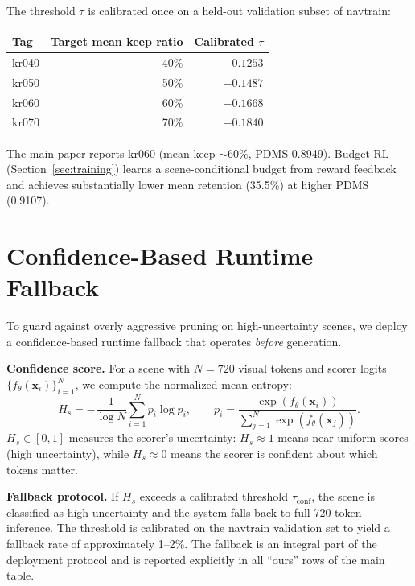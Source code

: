 \documentclass[letterpaper]{article}
\begin{document}
The threshold $\tau$ is calibrated once on a held-out validation subset of navtrain:
\begin{center}
\begin{tabular}{@{}lrr@{}}
\toprule
Tag & Target mean keep ratio & Calibrated $\tau$ \\
\midrule
kr040 & 40\% & $-0.1253$ \\
kr050 & 50\% & $-0.1487$ \\
kr060 & 60\% & $-0.1668$ \\
kr070 & 70\% & $-0.1840$ \\
\bottomrule
\end{tabular}
\end{center}

The main paper reports kr060 (mean keep $\sim$60\%, PDMS 0.8949). Budget RL (Section~\ref{sec:training})
learns a scene-conditional budget from reward feedback and achieves substantially lower mean
retention (35.5\%) at higher PDMS (0.9107).

\section{Confidence-Based Runtime Fallback}
\label{sec:fallback}

To guard against overly aggressive pruning on high-uncertainty scenes, we deploy a confidence-based
runtime fallback that operates \emph{before} generation.

\textbf{Confidence score.} For a scene with $N{=}720$ visual tokens and scorer logits
$\{f_\theta(\mathbf{x}_i)\}_{i=1}^{N}$, we compute the normalized mean entropy:
\begin{equation}
H_s = -\frac{1}{\log N}\sum_{i=1}^{N} p_i\log p_i,\qquad
p_i = \frac{\exp(f_\theta(\mathbf{x}_i))}{\sum_{j=1}^{N}\exp(f_\theta(\mathbf{x}_j))}.
\end{equation}
$H_s \in [0,1]$ measures the scorer's uncertainty: $H_s \approx 1$ means near-uniform scores (high
uncertainty), while $H_s \approx 0$ means the scorer is confident about which tokens matter.

\textbf{Fallback protocol.} If $H_s$ exceeds a calibrated threshold $\tau_{\mathrm{conf}}$, the
scene is classified as high-uncertainty and the system falls back to full 720-token inference. The
threshold is calibrated on the navtrain validation set to yield a fallback rate of approximately
1--2\%. The fallback is an integral part of the deployment protocol and is reported explicitly in
all ``ours'' rows of the main table.
\end{document}
